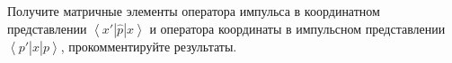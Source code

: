 \documentclass[__main__.tex]{subfiles}
\begin{document}
Получите матричные элементы оператора импульса в координатном представлении $\left<x'|\hat{p}|x\right>$ и оператора координаты в импульсном представлении $\left<p'|\hat{x}|p\right>$, прокомментируйте результаты.\\ 

\end{document}
